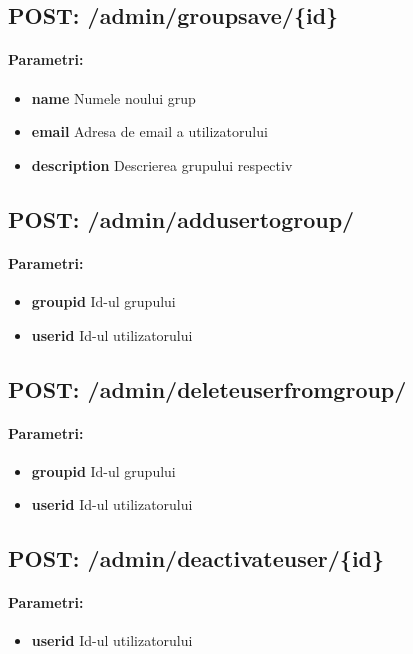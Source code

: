  \subsection*{POST: /admin/groupsave/\{id\}}

\paragraph{Parametri:}
\begin{itemize}
\item \textbf{name}
 Numele noului grup
\item \textbf{email}
 Adresa de email a utilizatorului
\item \textbf{description}
 Descrierea grupului respectiv
 \end{itemize}
 \subsection*{POST: /admin/addusertogroup/}

\paragraph{Parametri:}
\begin{itemize}
\item \textbf{groupid}
 Id-ul grupului 
\item \textbf{userid}
 Id-ul utilizatorului
 \end{itemize}
 \subsection*{POST: /admin/deleteuserfromgroup/}

\paragraph{Parametri:}
\begin{itemize}
\item \textbf{groupid}
 Id-ul grupului 
\item \textbf{userid}
 Id-ul utilizatorului
 \end{itemize}
 \subsection*{POST: /admin/deactivateuser/\{id\}}

\paragraph{Parametri:}
\begin{itemize}
\item \textbf{userid}
 Id-ul utilizatorului
 \end{itemize}

